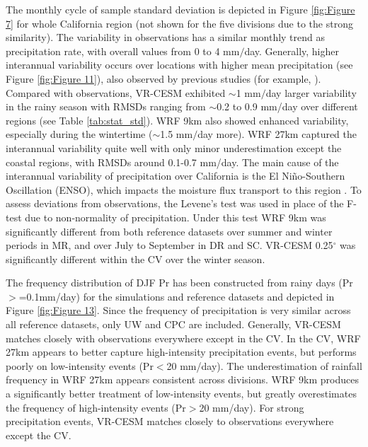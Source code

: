\documentclass[draft,ms]{agutex}   %
\begin{document}
\begin{article}
The monthly cycle of sample standard deviation is depicted in Figure \ref{fig:Figure 7} for whole California region (not shown for the five divisions due to the strong similarity). The variability in observations has a similar monthly trend as precipitation rate, with overall values from 0 to 4 mm$/$day.  Generally, higher interannual variability occurs over locations with higher mean precipitation (see Figure \ref{fig:Figure 11}), also observed by previous studies (for example, \cite{duffy2006simulations}). Compared with observations, VR-CESM exhibited $\sim$1 mm$/$day larger variability in the rainy season with RMSDs ranging from $\sim$0.2 to 0.9 mm/day over different regions (see Table \ref{tab:stat_std}). WRF 9km also showed enhanced variability, especially during the wintertime ($\sim$1.5 mm$/$day more). WRF 27km captured the interannual variability quite well with only minor underestimation except the coastal regions, with RMSDs around 0.1-0.7 mm/day. The main cause of the interannual variability of precipitation over California is the El Ni\~{n}o-Southern Oscillation (ENSO), which impacts the moisture flux transport to this region \citep{cayan1998decadal, cayan1999enso, leung2003hydroclimate2}. To assess deviations from observations, the Levene's test was used in place of the F-test due to non-normality of precipitation. Under this test WRF 9km was significantly different from both reference datasets over summer and winter periods in MR, and over July to September in DR and SC. VR-CESM 0.25$^\circ$ was significantly different within the CV over the  winter season.

The frequency distribution of DJF Pr has been constructed from rainy days (Pr$>$=0.1mm/day) for the simulations and reference datasets and depicted in Figure \ref{fig:Figure 13}.  Since the frequency of precipitation is very similar across all reference datasets, only UW and CPC are included. Generally, VR-CESM matches closely with observations everywhere except in the CV. In the CV, WRF 27km appears to better capture high-intensity precipitation events, but performs poorly on low-intensity events (Pr$<$20 mm/day). The underestimation of rainfall frequency in WRF 27km appears consistent across divisions. WRF 9km produces a significantly better treatment of low-intensity events, but greatly overestimates the frequency of high-intensity events (Pr$>$20 mm/day). For strong precipitation events, VR-CESM matches closely to observations everywhere except the CV.


\end{article}
\end{document}
